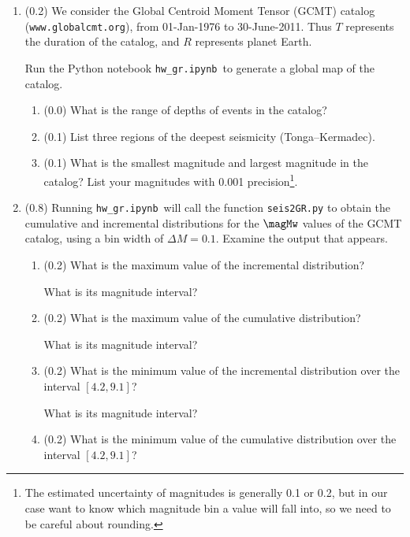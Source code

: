 \documentclass[11pt,titlepage,fleqn]{article}
\newcommand{\tfile}{{\tt hw\_gr.ipynb}}
\begin{document}
\begin{enumerate}
\item (0.2) We consider the Global Centroid Moment Tensor (GCMT) catalog (\verb+www.globalcmt.org+), from 01-Jan-1976 to 30-June-2011. Thus $T$ represents the duration of the catalog, and $R$ represents planet Earth.

Run the Python notebook \tfile\ to generate a global map of the catalog.
%
\begin{enumerate}
\item (0.0) What is the range of depths of events in the catalog?
\item (0.1) List three regions of the deepest seismicity (\eg Tonga--Kermadec).
\item (0.1) What is the smallest magnitude and largest magnitude in the catalog? List your magnitudes with 0.001 precision\footnote{The estimated uncertainty of magnitudes is generally 0.1 or 0.2, but in our case want to know which magnitude bin a value will fall into, so we need to be careful about rounding.}.
\end{enumerate}

\item (0.8) Running \tfile\ will call the function \verb+seis2GR.py+ to obtain the cumulative and incremental distributions for the $\magMw$ values of the GCMT catalog, using a bin width of $\Delta M = 0.1$. Examine the output that appears.


\begin{enumerate}
\item (0.2) What is the maximum value of the incremental distribution?

What is its magnitude interval?

\item (0.2) What is the maximum value of the cumulative distribution?

What is its magnitude interval?

\item (0.2) What is the minimum value of the incremental distribution over the interval $[4.2,9.1]$? 

What is its magnitude interval?

\item (0.2) What is the minimum value of the cumulative distribution over the interval $[4.2,9.1]$? 


\end{enumerate}
\end{enumerate}
\end{document}
